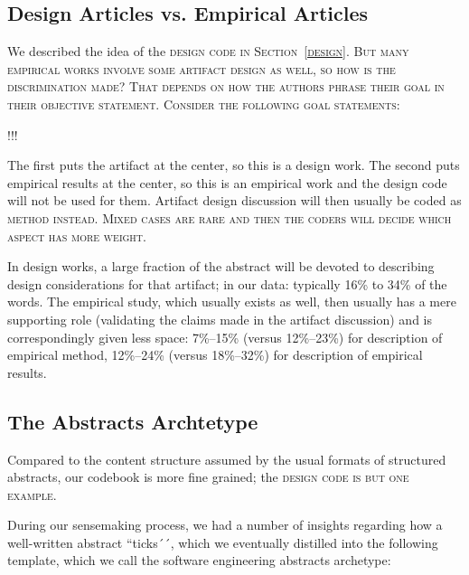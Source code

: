 \documentclass[10pt,journal,compsoc]{IEEEtran}
\newcommand{\Cb}[1]{\bgroup\scshape #1\egroup}  %
\begin{document}
\subsection{Design Articles vs. Empirical Articles}

We described the idea of the \Cb{design} code in Section~\ref{design}.
But many empirical works involve some artifact design as well,
so how is the discrimination made?
That depends on how the authors phrase their goal in their
\Cb{objective} statement.
Consider the following goal statements:

!!!

The first puts the artifact at the center, so this is a design work.
The second puts empirical results at the center, so this is an empirical work
and the design code will not be used for them.
Artifact design discussion will then usually be coded as \Cb{method} instead. 
Mixed cases are rare and then the coders will decide which aspect has more weight.

In design works, a large fraction of the abstract will be devoted to
describing design considerations for that artifact;
in our data: typically 16\% to 34\% of the words.
The empirical study, which usually exists as well, then usually has a mere 
supporting role (validating the claims made in the artifact discussion)
and is correspondingly given less space: 
7\%--15\% (versus 12\%--23\%) for description of empirical method,
12\%--24\% (versus 18\%--32\%) for description of empirical results.


\subsection{The Abstracts Archtetype}

Compared to the content structure assumed by the usual formats of
structured abstracts, our codebook is more fine grained;
the \Cb{design} code is but one example. 

During our sensemaking process, we had a number of insights regarding
how a well-written abstract ``ticks´´, which we eventually distilled into
the following template, which we call the software engineering abstracts archetype:
\end{document}
